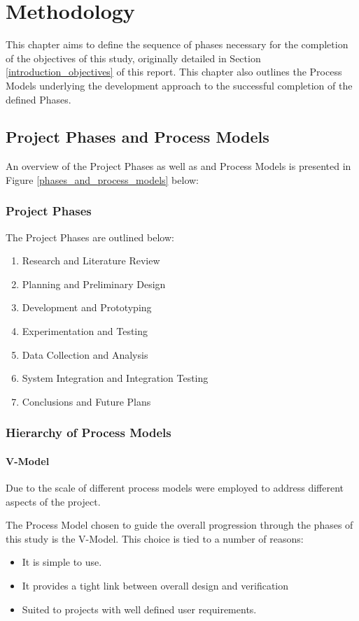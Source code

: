 \chapter{Methodology}\label{methodology}
This chapter aims to define the sequence of phases necessary for the completion
of the objectives of this study, originally detailed in Section
\ref{introduction_objectives} of this report.
This chapter also outlines the Process Models underlying the development
approach to the successful completion of the defined Phases.

\section{Project Phases and Process Models}
An overview of the Project Phases as well as and Process Models is presented in
Figure \ref{phases_and_process_models} below:

\subsection{Project Phases}
The Project Phases are outlined below:
\begin{enumerate}
    \item Research and Literature Review
    \item Planning and Preliminary Design
    \item Development and Prototyping 
    \item Experimentation and Testing
    \item Data Collection and Analysis
    \item System Integration and Integration Testing
    \item Conclusions and Future Plans
\end{enumerate}

\subsection{Hierarchy of Process Models}
\subsubsection{V-Model}
Due to the scale of different process models were employed to address different
aspects of the project.

The Process Model chosen to guide the overall progression through the phases of
this study is the V-Model. This choice is tied to a number of reasons: 
\begin{itemize}
    \item It is simple to use.
    \item It provides a tight link between overall design and verification 
    \item Suited to projects with well defined user requirements.
\end{itemize}

